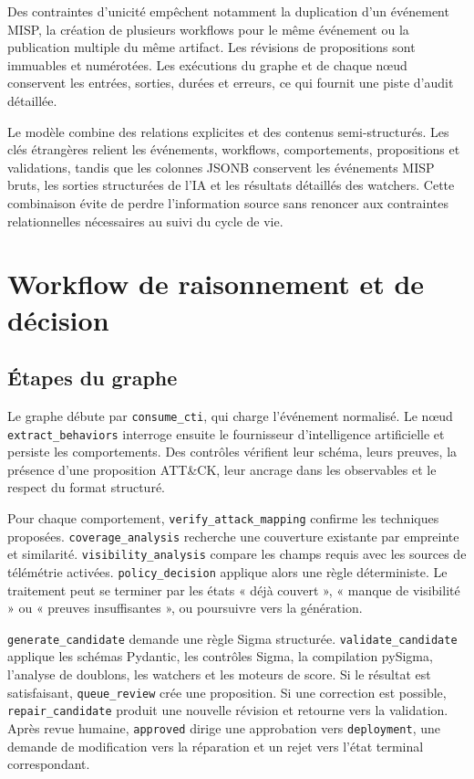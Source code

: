 Des contraintes d'unicité empêchent notamment la duplication d'un événement MISP, la création de plusieurs workflows pour le même événement ou la publication multiple du même artifact. Les révisions de propositions sont immuables et numérotées. Les exécutions du graphe et de chaque nœud conservent les entrées, sorties, durées et erreurs, ce qui fournit une piste d'audit détaillée.

Le modèle combine des relations explicites et des contenus semi-structurés. Les clés étrangères relient les événements, workflows, comportements, propositions et validations, tandis que les colonnes JSONB conservent les événements MISP bruts, les sorties structurées de l'IA et les résultats détaillés des watchers. Cette combinaison évite de perdre l'information source sans renoncer aux contraintes relationnelles nécessaires au suivi du cycle de vie.

\section{Workflow de raisonnement et de décision}

\subsection{Étapes du graphe}

Le graphe débute par \texttt{consume\_cti}, qui charge l'événement normalisé. Le nœud \texttt{extract\_behaviors} interroge ensuite le fournisseur d'intelligence artificielle et persiste les comportements. Des contrôles vérifient leur schéma, leurs preuves, la présence d'une proposition ATT\&CK, leur ancrage dans les observables et le respect du format structuré.

Pour chaque comportement, \texttt{verify\_attack\_mapping} confirme les techniques proposées. \texttt{coverage\_analysis} recherche une couverture existante par empreinte et similarité. \texttt{visibility\_analysis} compare les champs requis avec les sources de télémétrie activées. \texttt{policy\_decision} applique alors une règle déterministe. Le traitement peut se terminer par les états « déjà couvert », « manque de visibilité » ou « preuves insuffisantes », ou poursuivre vers la génération.

\texttt{generate\_candidate} demande une règle Sigma structurée. \texttt{validate\_candidate} applique les schémas Pydantic, les contrôles Sigma, la compilation pySigma, l'analyse de doublons, les watchers et les moteurs de score. Si le résultat est satisfaisant, \texttt{queue\_review} crée une proposition. Si une correction est possible, \texttt{repair\_candidate} produit une nouvelle révision et retourne vers la validation. Après revue humaine, \texttt{approved} dirige une approbation vers \texttt{deployment}, une demande de modification vers la réparation et un rejet vers l'état terminal correspondant.

